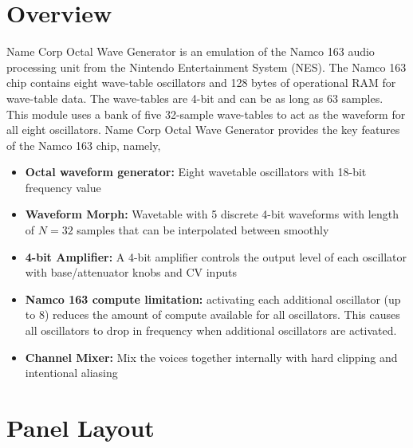 \documentclass[12pt,letter]{article}
\begin{document}


\section*{Overview}

Name Corp Octal Wave Generator is an emulation of the Namco 163 audio processing unit from the Nintendo Entertainment System (NES). The Namco 163 chip contains eight wave-table oscillators and 128 bytes of operational RAM for wave-table data. The wave-tables are 4-bit and can be as long as 63 samples. This module uses a bank of five 32-sample wave-tables to act as the waveform for all eight oscillators. Name Corp Octal Wave Generator provides the key features of the Namco 163 chip, namely,
\begin{itemize}
  \item \textbf{Octal waveform generator:} Eight wavetable oscillators with 18-bit frequency value
  \item \textbf{Waveform Morph:} Wavetable with 5 discrete 4-bit waveforms with length of $N = 32$ samples that can be interpolated between smoothly
  \item \textbf{4-bit Amplifier:} A 4-bit amplifier controls the output level of each oscillator with base/attenuator knobs and CV inputs
  \item \textbf{Namco 163 compute limitation:} activating each additional oscillator (up to 8) reduces the amount of compute available for all oscillators. This causes all oscillators to drop in frequency when additional oscillators are activated.
  \item \textbf{Channel Mixer:} Mix the voices together internally with hard clipping and intentional aliasing
\end{itemize}


\clearpage
\section*{Panel Layout}
\end{document}
